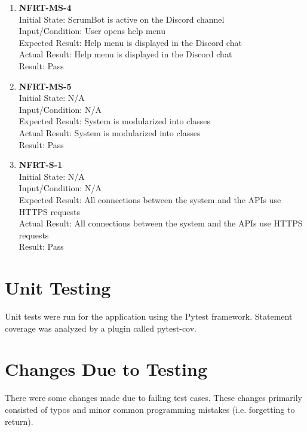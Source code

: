 \documentclass[12pt, titlepage]{article}
\begin{document}
\begin{enumerate}
    \item{\textbf{NFRT-MS-4}}\\
    Initial State: ScrumBot is active on the Discord channel\\
    Input/Condition: User opens help menu\\
    Expected Result: Help menu is displayed in the Discord chat\\
    Actual Result: Help menu is displayed in the Discord chat\\
    Result: Pass
    
    \item{\textbf{NFRT-MS-5}}\\
    Initial State: N/A\\
    Input/Condition: N/A\\
    Expected Result: System is modularized into classes\\
    Actual Result: System is modularized into classes\\
    Result: Pass
    
    \item{\textbf{NFRT-S-1}}\\
    Initial State: N/A\\
    Input/Condition: N/A\\
    Expected Result: All connections between the system and the APIs use HTTPS requests\\
    Actual Result: All connections between the system and the APIs use HTTPS requests\\
    Result: Pass
    
\end{enumerate}


\section{Unit Testing}
Unit tests were run for the application using the Pytest framework. Statement coverage was analyzed by a plugin called pytest-cov.

\section{Changes Due to Testing}
There were some changes made due to failing test cases. These changes primarily consisted of typos and minor common programming mistakes (i.e. forgetting to return).
\end{document}
